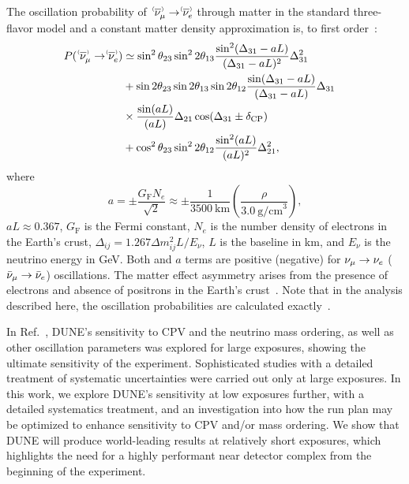 The oscillation probability of $\;\nu^{\bracketbar}_\mu \rightarrow \nu^{\bracketbar}_e$ through matter in the standard three-flavor model and a constant matter density approximation is, to first order~\cite{Nunokawa:2007qh}:
\begin{equation}
  \begin{aligned}
    P(\;\nu^{\bracketbar}_\mu \rightarrow \nu^{\bracketbar}_e) & \simeq \sin^2 \theta_{23} \sin^2 2 \theta_{13} 
    \frac{ \sin^2(\Delta_{31} - aL)}{(\Delta_{31}-aL)^2} \Delta_{31}^2 \\
    & + \sin 2 \theta_{23} \sin 2 \theta_{13} \sin 2 \theta_{12}\frac{ \sin(\Delta_{31} - aL)}{(\Delta_{31}-aL)} \Delta_{31} \\
    &\times \frac{\sin(aL)}{(aL)} \Delta_{21} \cos (\Delta_{31} \pm \deltacp) & \\
    & + \cos^2 \theta_{23} \sin^2 2 \theta_{12} \frac {\sin^2(aL)}{(aL)^2} \Delta_{21}^2,
  \end{aligned}
  \label{eqn:appprob}
\end{equation}
where
\begin{equation*}
  a = \pm \frac{G_{\mathrm{F}}N_e}{\sqrt{2}} \approx \pm\frac{1}{3500~\mathrm{km}}\left(\frac{\rho}{3.0~\mathrm{g/cm}^{3}}\right),
\end{equation*}
$aL \approx 0.367$, $G_{\mathrm{F}}$ is the Fermi constant, $N_e$ is the number density of electrons in the Earth's crust, $\Delta_{ij} = 1.267 \Delta m^2_{ij} L/E_\nu$, $L$ is the baseline in km, and $E_\nu$ is the neutrino energy in GeV.
Both \deltacp and $a$ terms are positive (negative) for $\nu_\mu \to \nu_e$ ($\bar\nu_\mu \to \bar\nu_e$) oscillations. The matter effect asymmetry arises from the presence of electrons and absence of positrons in the Earth's crust~\cite{Wolfenstein:1977ue,Mikheev:1986gs}. Note that in the analysis described here, the oscillation probabilities are calculated exactly~\cite{Barger:1980tf}. 

In Ref.~\cite{Abi:2020qib}, DUNE's sensitivity to CPV and the neutrino mass ordering, as well as other oscillation parameters was explored for large exposures, showing the ultimate sensitivity of the experiment. Sophisticated studies with a detailed treatment of systematic uncertainties were carried out only at large exposures. In this work, we explore DUNE's sensitivity at low exposures further, with a detailed systematics treatment, and an investigation into how the run plan may be optimized to enhance sensitivity to CPV and/or mass ordering. We show that DUNE will produce world-leading results at relatively short exposures, which highlights the need for a highly performant near detector complex from the beginning of the experiment. 


